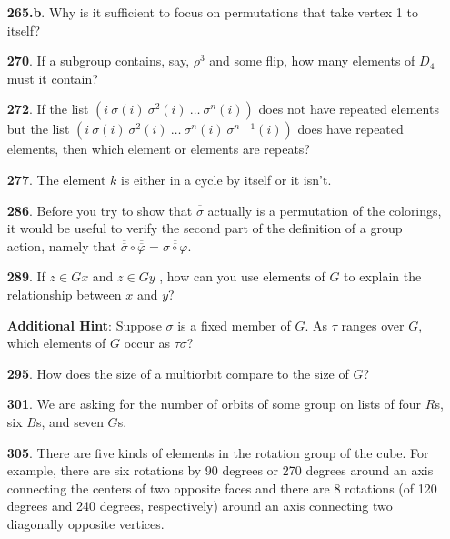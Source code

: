 \documentclass[10pt,]{book}
\theoremstyle{plain}
\theoremstyle{definition}
\theoremstyle{definition}
\numberwithin{equation}{chapter}
\begin{document}
\begin{itemize}[itemsep=1em]
\item[\textbf{265.b}.]\hypertarget{p-1531}{}%
Why is it sufficient to focus on permutations that take vertex 1 to itself?%

\item[\textbf{270}.]\hypertarget{p-1544}{}%
If a subgroup contains, say, \(\rho^3\) and some flip, how many elements of \(D_4\) must it contain?%

\item[\textbf{272}.]\hypertarget{p-1552}{}%
If the list \((i\ \sigma(i)\ \sigma^2(i)\ \ldots\ \sigma^n(i))\) does not have repeated elements but the list \((i\ \sigma(i)\ \sigma^2(i)\ \ldots\ \sigma^n(i)\ \sigma^{n+1}(i))\) does have repeated elements, then which element or elements are repeats?%

\item[\textbf{277}.]\hypertarget{p-1570}{}%
The element \(k\) is either in a cycle by itself or it isn't.%

\item[\textbf{286}.]\hypertarget{p-1626}{}%
Before you try to show that \(\overline{\overline{\sigma}}\) actually is a permutation of the colorings, it would be useful to verify the second part of the definition of a group action, namely that \(\overline{\overline{\sigma}}\circ\overline{\overline{\varphi}} = \overline{\overline{\sigma\circ\varphi}}\).%

\item[\textbf{289}.]\hypertarget{p-1644}{}%
If \(z \in Gx\) and \(z \in Gy\) , how can you use elements of \(G\) to explain the relationship between \(x\) and \(y\)?%

\par\smallskip
\noindent\textbf{Additional Hint}: \hypertarget{p-1645}{}%
Suppose \(\sigma\) is a fixed member of \(G\). As \(\tau\) ranges over \(G\), which elements of \(G\) occur as \(\tau\sigma\)?%

\item[\textbf{295}.]\hypertarget{p-1673}{}%
How does the size of a multiorbit compare to the size of \(G\)?%

\item[\textbf{301}.]\hypertarget{p-1701}{}%
We are asking for the number of orbits of some group on lists of four \(R\)s, six \(B\)s, and seven \(G\)s.%

\item[\textbf{305}.]\hypertarget{p-1710}{}%
There are five kinds of elements in the rotation group of the cube. For example, there are six rotations by 90 degrees or 270 degrees around an axis connecting the centers of two opposite faces and there are 8 rotations (of 120 degrees and 240 degrees, respectively) around an axis connecting two diagonally opposite vertices.%


\end{itemize}
\end{document}
